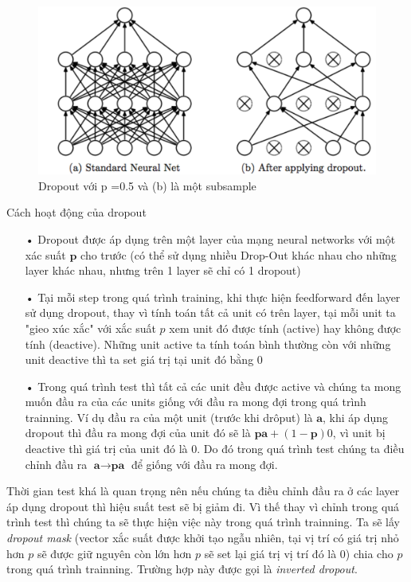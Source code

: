 \begin{center}
 	\begin{figure}[H]
    \begin{center}
    \includegraphics[scale=0.4]{chap3/image/dropout.png}
    \end{center}
    \caption{Dropout với p =0.5 và (b) là một subsample}
    \label{fig:dropout}
    \end{figure}
\end{center}

Cách hoạt động của dropout
\begin{itemize}
\item[•] Dropout được áp dụng trên một layer của mạng neural networks với một xác suất $\textbf{p}$ cho trước (có thể sử dụng nhiều Drop-Out khác nhau cho những layer khác nhau, nhưng trên 1 layer sẽ chỉ có 1 dropout)
\item[•] Tại mỗi step trong quá trình training, khi thực hiện feedforward đến layer sử dụng dropout, thay vì tính toán tất cả unit có trên layer, tại mỗi unit ta "gieo xúc xắc" với xắc suất $p$ xem unit đó được tính (active) hay không được tính (deactive). Những unit active ta tính toán bình thường còn với những unit deactive thì ta set giá trị tại unit đó bằng 0
\item[•] Trong quá trình test thì tất cả các unit đều được active và chúng ta mong muốn đầu ra của các units giống với đầu ra mong đợi trong quá trình trainning. Ví dụ đầu ra của một unit (trước khi drôput) là $\textbf{a}$, khi áp dụng dropout thì đầu ra mong đợi của unit đó sẽ là $\textbf{p}\textbf{a} + (1-\textbf{p})0$, vì unit bị deactive thì giá trị của unit đó là 0. Do đó trong quá trình test chúng ta điều chỉnh đầu ra $\textbf{a} \to \textbf{p}\textbf{a}$ để  giống với đầu ra mong đợi.
\end{itemize} \par
Thời gian test khá là quan trọng nên nếu chúng ta điều chỉnh đầu ra ở các layer áp dụng dropout thì hiệu suất test sẽ bị giảm đi. Vì thế thay vì chỉnh trong quá trình test thì chúng ta sẽ thực hiện việc này trong quá trình trainning. Ta sẽ lấy \textit{dropout mask} (vector xắc suất được khởi tạo ngẫu nhiên, tại vị trí có giá trị nhỏ hơn $p$ sẽ được giữ nguyên còn lớn hơn $p$ sẽ set lại giá trị vị trí đó là 0) chia cho $p$ trong quá trình trainning. Trường hợp này được gọi là \textit{inverted dropout}.